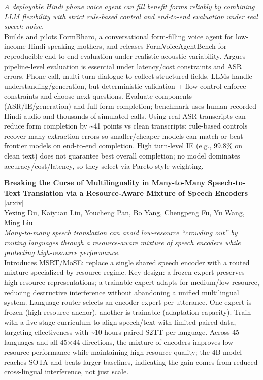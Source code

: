 \documentclass[12pt,letterpaper]{article}
\begin{document}
{\small\textit{A deployable Hindi phone voice agent can fill benefit forms reliably by combining LLM flexibility with strict rule-based control and end-to-end evaluation under real speech noise.}}\\[1pt]
{\footnotesize Builds and pilots FormBharo, a conversational form-filling voice agent for low-income Hindi-speaking mothers, and releases FormVoiceAgentBench for reproducible end-to-end evaluation under realistic acoustic variability. Argues pipeline-level evaluation is essential under latency/cost constraints and ASR errors. Phone-call, multi-turn dialogue to collect structured fields. LLMs handle understanding/generation, but deterministic validation + flow control enforce constraints and choose next questions. Evaluate components (ASR/IE/generation) and full form-completion; benchmark uses human-recorded Hindi audio and thousands of simulated calls. Using real ASR transcripts can reduce form completion by \textasciitilde{}41 points vs clean transcripts; rule-based controls recover many extraction errors so smaller/cheaper models can match or beat frontier models on end-to-end completion. High turn-level IE (e.g., 99.8\% on clean text) does not guarantee best overall completion; no model dominates accuracy/cost/latency, so they select via Pareto-style weighting.}

\medskip

{\small\textbf{Breaking the Curse of Multilinguality in Many-to-Many Speech-to-Text Translation via a Resource-Aware Mixture of Speech Encoders}} {\scriptsize[\href{https://arxiv.org/abs/2608.04586}{arxiv}]}\\
{\scriptsize Yexing Du, Kaiyuan Liu, Youcheng Pan, Bo Yang, Chengpeng Fu, Yu Wang, Ming Liu}\\

{\small\textit{Many-to-many speech translation can avoid low-resource ``crowding out'' by routing languages through a resource-aware mixture of speech encoders while protecting high-resource performance.}}\\[1pt]
{\footnotesize Introduces MSRT/MoSE: replace a single shared speech encoder with a routed mixture specialized by resource regime. Key design: a frozen expert preserves high-resource representations; a trainable expert adapts for medium/low-resource, reducing destructive interference without abandoning a unified multilingual system. Language router selects an encoder expert per utterance. One expert is frozen (high-resource anchor), another is trainable (adaptation capacity). Train with a five-stage curriculum to align speech/text with limited paired data, targeting effectiveness with \textasciitilde{}10 hours paired S2TT per language. Across 45 languages and all 45×44 directions, the mixture-of-encoders improves low-resource performance while maintaining high-resource quality; the 4B model reaches SOTA and beats larger baselines, indicating the gain comes from reduced cross-lingual interference, not just scale.}
\end{document}
